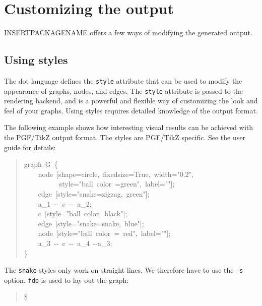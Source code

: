 \documentclass[10pt,a4paper,english]{article}
\begin{document}

\hypertarget{customizing-the-output}{}
\section*{Customizing the output}
\label{customizing-the-output}

INSERTPACKAGENAME offers a few ways of modifying the generated output.



\hypertarget{using-styles}{}
\subsection*{Using styles}
\label{using-styles}

The dot language defines the \texttt{style} attribute that can be used to modify the appearance of graphs, nodes, and edges. The \texttt{style} attribute is passed to the rendering backend, and is a powerful and flexible way of customizing the look and feel of your graphs. Using styles requires detailed knowledge of the output format.

The following example shows how interesting visual results can be achieved with the PGF/TikZ output format. The styles are PGF/TikZ specific. See the user guide for details:
\begin{quote}{\ttfamily \raggedright \noindent
graph~G~{\{}~\\
~~~~node~{[}shape=circle,~fixedsize=True,~width="0.2",~\\
~~~~~~~~~~style="ball~color~=green",~label="{}"{]};~\\
~~~~edge~{[}style="snake=zigzag,~green"{]};~\\
~~~~a{\_}1~-{}-~c~-{}-~a{\_}2;~\\
~~~~c~{[}style="ball~color=black"{]};~\\
~~~~edge~{[}style="snake=snake,~blue"{]};~\\
~~~~node~{[}style="ball~color~=~red",~label="{}"{]};~\\
~~~~a{\_}3~-{}-~c~-{}-~a{\_}4~-{}-a{\_}3;~\\
{\}}
}\end{quote}

The \texttt{snake} styles only work on straight lines. We therefore have to use the \texttt{-s} option. \texttt{fdp} is used to lay out the graph:
\begin{quote}{\ttfamily \raggedright \noindent
{\$}~
}\end{quote}
\end{document}
